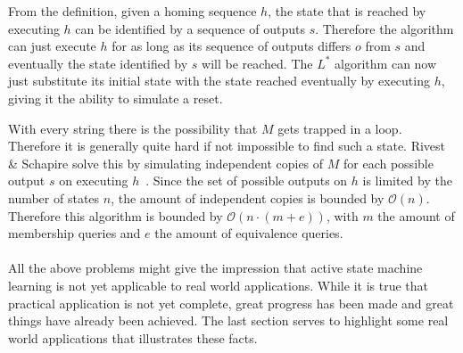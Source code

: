 From the definition, given a homing sequence $h$, the state that is reached
by executing $h$ can be identified by a sequence of outputs $s$.
Therefore the algorithm can just execute $h$ for as long as its sequence of
outputs differs $o$ from $s$ and eventually the state identified by $s$ will be reached.
The $L^*$ algorithm can now just substitute its initial state with the state
reached eventually by executing $h$, giving it the ability to simulate a reset.

With every string there is the possibility that $M$ gets trapped in a loop.
Therefore it is generally quite hard if not impossible to find such a state.
Rivest \& Schapire solve this by simulating independent copies of $M$ for each
possible output $s$ on executing $h$~\cite[p. 313]{Rivest1993}.  Since the set
of possible outputs on $h$ is limited by the number of states $n$, the amount of
independent copies is bounded by $\mathcal{O}(n)$.  Therefore this algorithm is
bounded by $\mathcal{O}(n \cdot (m + e))$, with $m$ the amount of membership
queries and $e$ the amount of equivalence queries.
\\
\\
All the above problems might give the impression that active state machine
learning is not yet applicable to real world applications. While it is true that
practical application is not yet complete, great progress has been made and
great things have already been achieved. The last section serves to highlight
some real world applications that illustrates these facts.

